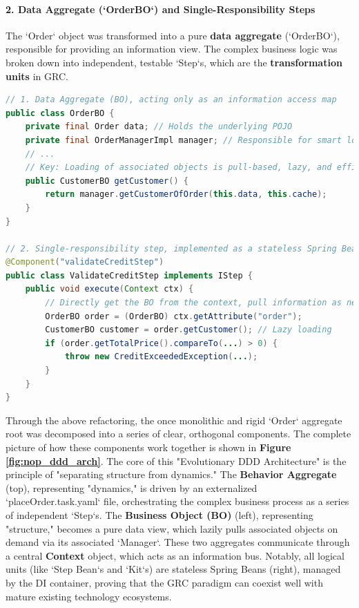 \documentclass[11pt]{article}
\begin{document}
\paragraph{2. Data Aggregate (`OrderBO`) and Single-Responsibility Steps}
The `Order` object was transformed into a pure \textbf{data aggregate} (`OrderBO`), responsible for providing an information view. The complex business logic was broken down into independent, testable `Step`s, which are the \textbf{transformation units} in GRC.

\begin{lstlisting}[language=Java, caption={Refactored Data Aggregate and Step}]
// 1. Data Aggregate (BO), acting only as an information access map
public class OrderBO {
    private final Order data; // Holds the underlying POJO
    private final OrderManagerImpl manager; // Responsible for smart loading
    // ...
    // Key: Loading of associated objects is pull-based, lazy, and efficient
    public CustomerBO getCustomer() {
        return manager.getCustomerOfOrder(this.data, this.cache);
    }
}

// 2. Single-responsibility step, implemented as a stateless Spring Bean
@Component("validateCreditStep")
public class ValidateCreditStep implements IStep {
    public void execute(Context ctx) {
        // Directly get the BO from the context, pull information as needed
        OrderBO order = (OrderBO) ctx.getAttribute("order");
        CustomerBO customer = order.getCustomer(); // Lazy loading
        if (order.getTotalPrice().compareTo(...) > 0) {
            throw new CreditExceededException(...);
        }
    }
}
\end{lstlisting}

Through the above refactoring, the once monolithic and rigid `Order` aggregate root was decomposed into a series of clear, orthogonal components. The complete picture of how these components work together is shown in \textbf{Figure \ref{fig:nop_ddd_arch}}. The core of this "Evolutionary DDD Architecture" is the principle of "separating structure from dynamics." The \textbf{Behavior Aggregate} (top), representing "dynamics," is driven by an externalized `placeOrder.task.yaml` file, orchestrating the complex business process as a series of independent `Step`s. The \textbf{Business Object (BO)} (left), representing "structure," becomes a pure data view, which lazily pulls associated objects on demand via its associated `Manager`. These two aggregates communicate through a central \textbf{Context} object, which acts as an information bus. Notably, all logical units (like `Step Bean`s and `Kit`s) are stateless Spring Beans (right), managed by the DI container, proving that the GRC paradigm can coexist well with mature existing technology ecosystems.
\end{document}
